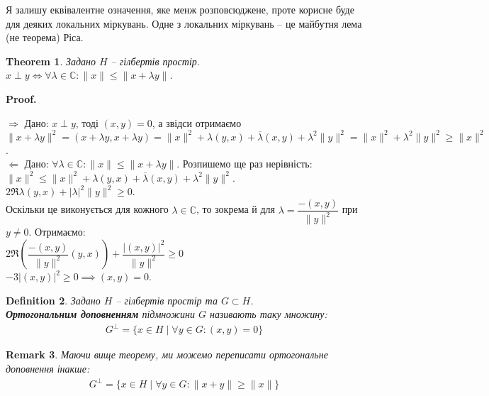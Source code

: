 \documentclass[a4paper, 10pt]{article}
\makeatletter
\def\rightproof{$\boxed{\Rightarrow}$ }
\def\leftproof{$\boxed{\Leftarrow}$ }
\theoremstyle{theoremdd}
\newtheorem{theorem}{Theorem}[subsection]
\theoremstyle{theoremdd}
\newtheorem{definition}[theorem]{Definition}
\theoremstyle{theoremdd}
\theoremstyle{theoremdd}
\theoremstyle{theoremdd}
\theoremstyle{theoremdd}
\newtheorem{remark}[theorem]{Remark}
\theoremstyle{theoremdd}
\theoremstyle{theoremdd}
\renewenvironment{proof}[1][Proof.\\]{\par
\pushQED{\hfill \qed}%
\normalfont \topsep6\p@\@plus6\p@\relax
\trivlist
\item\relax
{\bfseries
#1\@addpunct{.}}\hspace\labelsep\ignorespaces
}{%
\popQED\endtrivlist\@endpefalse
}
\makeatother
\begin{document}
\noindent Я залишу еквівалентне означення, яке менж розповсюджене, проте корисне буде для деяких локальних міркувань. Одне з локальних міркувань -- це майбутня лема (не теорема) Ріса.

\begin{theorem}
Задано $H$ -- гілбертів простір.\\
$x \perp y \iff \forall \lambda \in \mathbb{C}: \|x\| \leq \|x + \lambda y\|$.
\end{theorem}

\begin{proof}
\rightproof Дано: $x \perp y$, тоді $(x,y) = 0$, а звідси отримаємо\\
$\|x + \lambda y\|^2 = (x+\lambda y, x+\lambda y) = \|x\|^2 + \lambda (y,x) + \overline{\lambda}(x,y) + \lambda^2 \|y\|^2 = \|x\|^2 + \lambda^2 \|y\|^2 \geq \|x\|^2$.
\bigskip \\
\leftproof Дано: $\forall \lambda \in \mathbb{C}: \|x\| \leq \|x + \lambda y\|$. Розпишемо ще раз нерівність:\\
$\|x\|^2 \leq \|x\|^2 + \lambda (y,x) + \overline{\lambda}(x,y) + \lambda^2 \|y\|^2$.\\
$2 \Re \lambda (y,x) + |\lambda|^2 \|y\|^2 \geq 0$.\\
Оскільки це виконується для кожного $\lambda \in \mathbb{C}$, то зокрема й для $\lambda = \dfrac{-(x,y)}{\|y\|^2}$ при $y \neq 0$. Отримаємо:\\
$2 \Re \left( \dfrac{-(x,y)}{\|y\|^2} (y,x) \right) + \dfrac{|(x,y)|^2}{\|y\|^2}  \geq 0$\\
$-3 |(x,y)|^2 \geq 0 \implies (x,y) = 0$.
\end{proof}

\begin{definition}
Задано $H$ -- гілбертів простір та $G \subset H$.\\
\textbf{Ортогональним доповненням} підмножини $G$ називають таку множину:
\begin{align*}
G^\perp = \{x \in H \mid \forall y \in G: (x,y) = 0\}
\end{align*}
\end{definition}

\begin{remark}
Маючи вище теорему, ми можемо переписати ортогональне доповнення інакше:
\begin{align*}
G^\perp = \{x \in H \mid \forall y \in G: \|x+y\| \geq \|x\|\}
\end{align*}
\end{remark}
\end{document}

